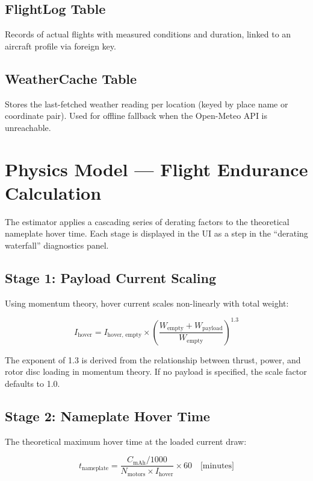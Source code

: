 \documentclass[11pt,a4paper]{article}
\begin{document}
\subsection{FlightLog Table}
Records of actual flights with measured conditions and duration, linked to an aircraft profile via foreign key.

\subsection{WeatherCache Table}
Stores the last-fetched weather reading per location (keyed by place name or coordinate pair). Used for offline fallback when the Open-Meteo API is unreachable.

\newpage

\section{Physics Model --- Flight Endurance Calculation}

The estimator applies a cascading series of derating factors to the theoretical nameplate hover time. Each stage is displayed in the UI as a step in the ``derating waterfall'' diagnostics panel.

\subsection{Stage 1: Payload Current Scaling}
Using momentum theory, hover current scales non-linearly with total weight:

\begin{equation}
    I_{\text{hover}} = I_{\text{hover, empty}} \times \left(\frac{W_{\text{empty}} + W_{\text{payload}}}{W_{\text{empty}}}\right)^{1.3}
\end{equation}

The exponent of 1.3 is derived from the relationship between thrust, power, and rotor disc loading in momentum theory. If no payload is specified, the scale factor defaults to 1.0.

\subsection{Stage 2: Nameplate Hover Time}
The theoretical maximum hover time at the loaded current draw:

\begin{equation}
    t_{\text{nameplate}} = \frac{C_{\text{mAh}} / 1000}{N_{\text{motors}} \times I_{\text{hover}}} \times 60 \quad \text{[minutes]}
\end{equation}
\end{document}
